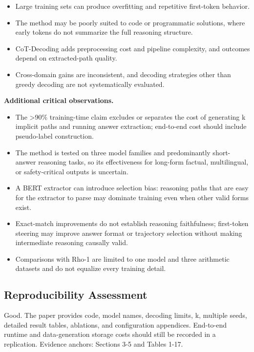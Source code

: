 \documentclass[11pt]{article}
\begin{document}
\begin{itemize}
\item
  Large training sets can produce overfitting and repetitive first-token
  behavior.
\item
  The method may be poorly suited to code or programmatic solutions,
  where early tokens do not summarize the full reasoning structure.
\item
  CoT-Decoding adds preprocessing cost and pipeline complexity, and
  outcomes depend on extracted-path quality.
\item
  Cross-domain gains are inconsistent, and decoding strategies other
  than greedy decoding are not systematically evaluated.
\end{itemize}

\textbf{Additional critical observations.}

\begin{itemize}
\item
  The \textgreater90\% training-time claim excludes or separates the
  cost of generating k implicit paths and running answer extraction;
  end-to-end cost should include pseudo-label construction.
\item
  The method is tested on three model families and predominantly
  short-answer reasoning tasks, so its effectiveness for long-form
  factual, multilingual, or safety-critical outputs is uncertain.
\item
  A BERT extractor can introduce selection bias: reasoning paths that
  are easy for the extractor to parse may dominate training even when
  other valid forms exist.
\item
  Exact-match improvements do not establish reasoning faithfulness;
  first-token steering may improve answer format or trajectory selection
  without making intermediate reasoning causally valid.
\item
  Comparisons with Rho-1 are limited to one model and three arithmetic
  datasets and do not equalize every training detail.
\end{itemize}

\subsection{Reproducibility
Assessment}\label{reproducibility-assessment-1}

Good. The paper provides code, model names, decoding limits, k, multiple
seeds, detailed result tables, ablations, and configuration appendices.
End-to-end runtime and data-generation storage costs should still be
recorded in a replication. Evidence anchors: Sections 3-5 and Tables
1-17.
\end{document}
